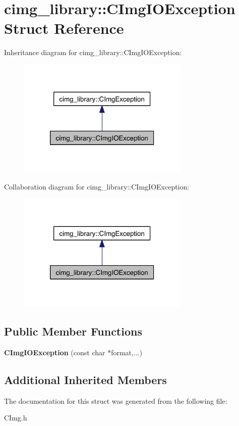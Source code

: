 \hypertarget{structcimg__library_1_1_c_img_i_o_exception}{\section{cimg\-\_\-library\-:\-:C\-Img\-I\-O\-Exception Struct Reference}
\label{structcimg__library_1_1_c_img_i_o_exception}
}


Inheritance diagram for cimg\-\_\-library\-:\-:C\-Img\-I\-O\-Exception\-:
\nopagebreak
\begin{figure}[H]
\begin{center}
\leavevmode
\includegraphics[width=232pt]{structcimg__library_1_1_c_img_i_o_exception__inherit__graph}
\end{center}
\end{figure}


Collaboration diagram for cimg\-\_\-library\-:\-:C\-Img\-I\-O\-Exception\-:
\nopagebreak
\begin{figure}[H]
\begin{center}
\leavevmode
\includegraphics[width=232pt]{structcimg__library_1_1_c_img_i_o_exception__coll__graph}
\end{center}
\end{figure}
\subsection*{Public Member Functions}
\begin{DoxyCompactItemize}
\item 
\hypertarget{structcimg__library_1_1_c_img_i_o_exception_a055e2ead04a81ae630b616bac1cb265e}{{\bfseries C\-Img\-I\-O\-Exception} (const char $\ast$format,...)}\label{structcimg__library_1_1_c_img_i_o_exception_a055e2ead04a81ae630b616bac1cb265e}

\end{DoxyCompactItemize}
\subsection*{Additional Inherited Members}


The documentation for this struct was generated from the following file\-:\begin{DoxyCompactItemize}
\item 
C\-Img.\-h\end{DoxyCompactItemize}
